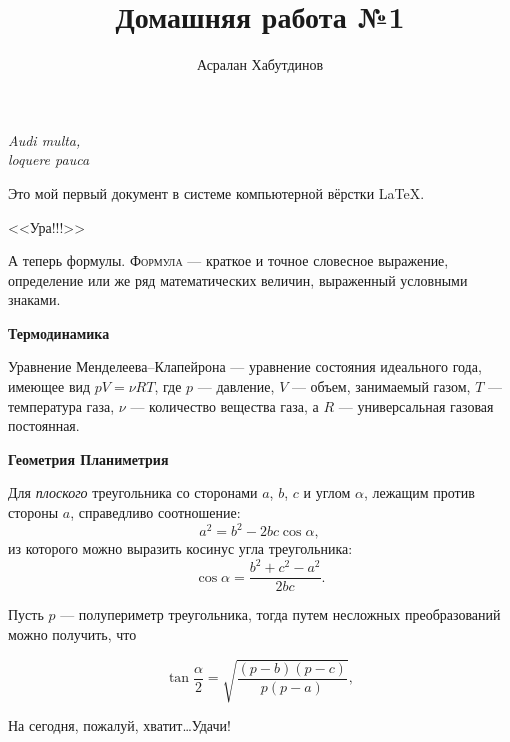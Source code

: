 \documentclass[12pt]{article}
\title{Домашняя работа №1}
\author{Асралан Хабутдинов}
\date{}
\begin{document}
	\maketitle
	\begin{flushright}
	{
	\textit{
	Audi multa, \\
	loquere pauca
	}
	}
	\end{flushright}
	\vspace{6pt}
	\begin{center}
	Это мой первый документ в системе компьютерной вёрстки \LaTeX.
	\end{center}
	\begin{center}
	\vspace{4pt}
	{
	\Huge
	\sffamily
	<<Ура!!!>>
	}
	
	\end{center}
	\hspace{14pt}
	А теперь формулы. \textsc{Формула} --- краткое и точное словесное выражение, определение или же ряд математических величин, выраженный условными знаками.
	
	\vspace{15pt}
	\hspace{14pt}
	{
	\bfseries
	\Large
	Термодинамика
	}
	
	Уравнение Менделеева--Клапейрона --- уравнение состояния идеального года, имеющее вид $pV = \nu RT$, где $p$ --- давление, $V$ --- объем, занимаемый газом, $T$ --- температура газа, $\nu$ --- количество вещества газа, а $R$ --- универсальная газовая постоянная.
	
	\vspace{15pt}
	\hspace{14pt}
	{
	\bfseries
	\Large
	Геометрия \hfill Планиметрия
	}
	
	Для \textsl{плоского} треугольника со сторонами $a$, $b$, $c$ и углом $\alpha$, лежащим против стороны $a$, справедливо соотношение:
	$$
	a^2=b^2-2bc\cos{\alpha},
	$$
	из которого можно выразить косинус угла треугольника:
	$$
	\cos{\alpha} = \frac{b^2+c^2-a^2}{2bc}.
	$$
	
	Пусть $p$ --- полупериметр треугольника, тогда путем несложных преобразований можно получить, что 
	
	$$
	\tan{\frac{\alpha}{2}} = \sqrt{\frac{(p-b)(p-c)}{p(p-a)}},
	$$
	\vspace{0.5776cm}
	
	\begin{flushleft}
	На сегодня, пожалуй, хватит\dots Удачи!
	\end{flushleft}
\end{document}
